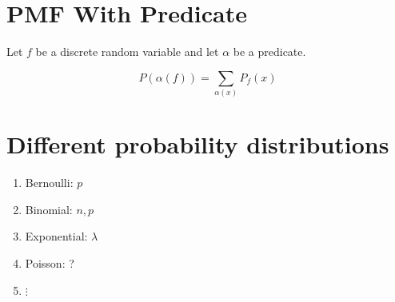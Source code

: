 \documentclass{article}
\begin{document}
\section*{PMF With Predicate}

Let $f$ be a discrete random variable and let $\alpha$ be a predicate.

\[
P(\alpha(f))=\sum\limits_{\alpha(x)}P_f(x)
\]

\section*{Different probability distributions}

\begin{enumerate}
\item Bernoulli: $p$
\item Binomial: $n,p$
\item Exponential: $\lambda$
\item Poisson: ?
\item $\vdots$
\end{enumerate}
\end{document}
